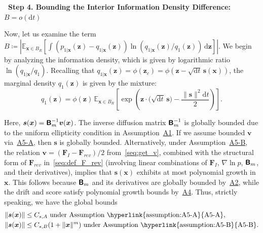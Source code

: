 \noindent\textbf{\textbullet\ Step 4. Bounding the Interior Information Density Difference:} $B=o(\mathrm dt)$

Now, let us examine the term $B\coloneq|\mathbb E_{\bm x\in B_R}[\int (p_{1|\bm x}(\bm z)-q_{1|\bm x}(\bm z))\ln(q_{1|\bm x}(\bm z)/q_1(\bm z))\,\mathrm d\bm z]|$. We begin by analyzing the information density, which is given by logarithmic ratio $\ln(q_{1|\bm x}/q_1)$. Recalling that $q_{1|\bm x}(\bm z)=\phi(\bm z_c)=\phi(\bm z-\sqrt{\mathrm dt}\,\bm s(\bm x))$, the marginal density $q_1(\bm z)$ is given by the mixture:
\begin{equation}
    q_1(\bm z)=\phi(\bm z)\,
    \mathbb E_{\bm x\in B_R}\!\!\left[
    \exp\left(\bm z\cdot\big(\sqrt{\mathrm dt}\,\bm s\big)
    -\frac{\|\bm s\|^2\mathrm dt}{2}
    \right)\right].
    \label{seq:q_1_expression_by_q_1x}
\end{equation}

Here, $\bm s(\bm x)=\boldsymbol{\mathsf{B}}_m^{-1}\bm v(\bm x)$. The inverse diffusion matrix $\boldsymbol{\mathsf{B}}_m^{-1}$ is globally bounded due to the uniform ellipticity condition in Assumption~\hyperlink{assumption:A1}{A1}. If we assume bounded $\bm v$ via~\hyperlink{assumption:A5-A}{A5-A}, then $\bm s$ is globally bounded. Alternatively, under Assumption~\hyperlink{assumption:A5-B}{A5-B}, the relation $\bm v=(\bm F_I-\bm F_{rev})/2$ from~\eqref{seq:get_v}, combined with the structural form of $\bm F_{rev}$ in~\eqref{seq:def_F_rev} (involving linear combinations of $\bm F_I$, $\nabla\ln p$, $\boldsymbol{\mathsf{B}}_m$, and their derivatives), implies that $\bm s(\bm x)$ exhibits at most polynomial growth in $\bm x$. This follows because $\boldsymbol{\mathsf{B}}_m$ and its derivatives are globally bounded by~\hyperlink{assumption:A2}{A2}, while the drift and score satisfy polynomial growth bounds by~\hyperlink{assumption:A4}{A4}. Thus, strictly speaking, we have the global bounds
\begin{subequations}\label{seq:s_bound}
\renewcommand{\theequation}{\theparentequation-\Alph{equation}}
\begin{align}
    \|\bm s(\bm x)\|&\leq C_{s,A}
    \text{ under Assumption~\hyperlink{assumption:A5-A}{A5-A}},
    \label{seq:s_bound_A}
    \\
    \|\bm s(\bm x)\|&\leq C_{s,B}
    (1+\|\bm x\|^m)   
    \text{ under Assumption~\hyperlink{assumption:A5-B}{A5-B}}.
    \label{seq:s_bound_B}
\end{align}
\end{subequations}

